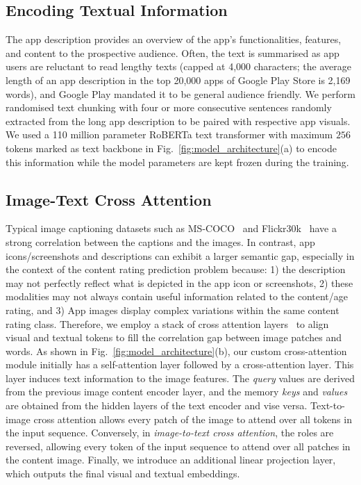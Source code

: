 \subsection{Encoding Textual Information}
The app description provides an overview of the app's functionalities, features, and content to the prospective audience. Often, the text is summarised as app users are reluctant to read lengthy texts (capped at 4,000 characters; the average length of an app description in the top 20,000 apps of Google Play Store is 2,169 words), and Google Play mandated it to be general audience friendly. We perform randomised text chunking with four or more consecutive sentences randomly extracted from the long app description to be paired with respective app visuals.
We used a 110 million parameter RoBERTa text transformer with maximum $256$ tokens marked as text backbone in Fig.~\ref{fig:model_architecture}(a) to encode this information while the model parameters are kept frozen during the training. 

\subsection{Image-Text Cross Attention}
\label{ssec:cross attention}

Typical image captioning datasets such as MS-COCO~\cite{lin2014microsoft} and Flickr30k~\cite{young2014image} have a strong correlation between the captions and the images.
In contrast, app icons/screenshots and descriptions can exhibit a larger semantic gap, especially in the context of the content rating prediction problem because: 1) the description may not perfectly reflect what is depicted in the app icon or screenshots, 2) these modalities may not always contain useful information related to the content/age rating, and 3) App images display complex variations within the same content rating class. Therefore, we employ a stack of cross attention layers~\cite{vaswani2017attention} to align visual and textual tokens to fill the correlation gap between image patches and words. As shown in Fig.~\ref{fig:model_architecture}(b), our custom cross-attention module initially has a self-attention layer followed by a cross-attention layer. This layer induces text information to the image features. The \emph{query} values are derived from the previous image content encoder layer, and the memory \emph{keys} and \emph{values} are obtained from the hidden layers of the text encoder and vise versa. Text-to-image cross attention allows every patch of the image to attend over all tokens in the input sequence. Conversely, in \emph{image-to-text cross attention}, the roles are reversed, allowing every token of the input sequence to attend over all patches in the content image.
Finally, we introduce an additional linear projection layer, which outputs the final visual and textual embeddings.


